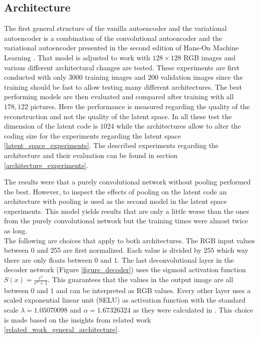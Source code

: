 \subsection{Architecture} \label{architecture}

The first general structure of the vanilla autoencoder and the variational autoencoder is a combination 
of the convolutional autoencoder and the variational autoencoder presented in the second edition of
Hans-On Machine Learning \parencite{2017-geron-homl}.
That model is adjusted to work with $128\times 128$ RGB images and various different architectural
changes are tested. These experiments are first conducted with only $3000$ training images and $200$ validation
images since the training should be fast to allow testing many different architectures. The best performing
models are then evaluated and compared after training with all $178,122$ pictures. 
Here the performance is measured regarding the quality of the reconstruction and not the quality of the latent space.
In all these test the dimension
of the latent code is $1024$ while the architectures allow to alter the coding size for the experiments regarding
the latent space \ref{latent_space_experiments}. The described experiments regarding the architecture and their
evaluation can be found
in section \ref{architecture_experiments}.

The results were that a purely convolutional network without pooling performed the best. However, to inspect the 
effects of pooling on the latent code an architecture with pooling is used as the second model in the latent space
experiments. This model yields results that are only a little worse than the ones from the purely convolutional
network but the training times were almost twice as long.\\

The following are choices that apply to both architectures. The RGB input values between 0 and 255 are first 
normalized. Each value is divided by $255$ which way there are only floats between $0$ and $1$.
The last deconvolutional layer in the decoder network (Figure \ref{figure_decoder}) uses the sigmoid activation
function $S(x) = \frac{e^x}{e^x+1}$. This guarantees that the values in the output image are all 
between $0$ and $1$ and can be interpreted as RGB values. 
Every other layer uses a scaled exponential linear unit (SELU) as activation function with the standard scale
$\lambda = 1.05070098$ and $\alpha = 1.67326324$ as they were calculated in \parencite{2017-klambauer-selu}.
This choice is made based on the insights from related work \ref{related_work_general_architecture}.

